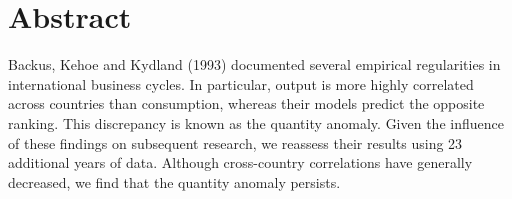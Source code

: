 \section*{Abstract}

Backus, Kehoe and Kydland (1993) documented several empirical regularities in international business cycles. In particular, output is more highly correlated across countries than consumption, whereas their models predict the opposite ranking. This discrepancy is known as the quantity anomaly. Given the influence of these findings on subsequent research, we reassess their results using 23 additional years of data. Although cross-country correlations have generally decreased, we find that the quantity anomaly persists.